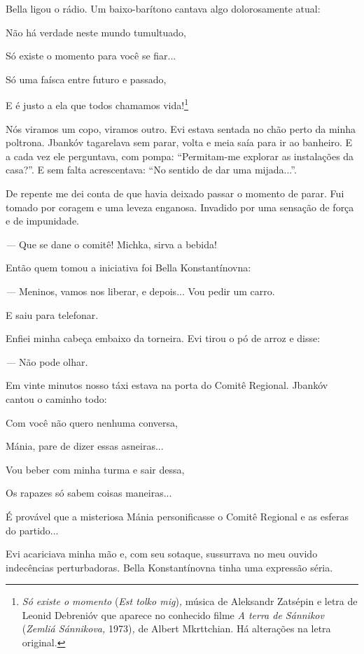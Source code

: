Bella ligou o rádio. Um baixo-barítono cantava algo dolorosamente atual:

Não há verdade neste mundo tumultuado,

Só existe o momento para você se fiar...

Só uma faísca entre futuro e passado,

E é justo a ela que todos chamamos vida!\footnote{\emph{Só existe o
  momento} (\emph{Est tolko mig})\emph{,} música de Aleksandr Zatsépin e
  letra de Leonid Debrenióv que aparece no conhecido filme \emph{A terra
  de Sánnikov} (\emph{Zemliá Sánnikova,} 1973)\emph{,} de Albert
  Mkrttchian. Há alterações na letra original.}

Nós viramos um copo, viramos outro. Evi estava sentada no chão perto da
minha poltrona. Jbankóv tagarelava sem parar, volta e meia saía para ir
ao banheiro. E a cada vez ele perguntava, com pompa: ``Permitam-me
explorar as instalações da casa?''. E sem falta acrescentava: ``No
sentido de dar uma mijada...''.

De repente me dei conta de que havia deixado passar o momento de parar.
Fui tomado por coragem e uma leveza enganosa. Invadido por uma sensação
de força e de impunidade.

\emph{---} Que se dane o comitê! Michka, sirva a bebida!

Então quem tomou a iniciativa foi Bella Konstantínovna:

\emph{---} Meninos, vamos nos liberar, e depois... Vou pedir um carro.

E saiu para telefonar.

Enfiei minha cabeça embaixo da torneira. Evi tirou o pó de arroz e
disse:

\emph{---} Não pode olhar.

Em vinte minutos nosso táxi estava na porta do Comitê Regional. Jbankóv
cantou o caminho todo:

Com você não quero nenhuma conversa,

Mánia, pare de dizer essas asneiras...

Vou beber com minha turma e sair dessa,

Os rapazes só sabem coisas maneiras...

É provável que a misteriosa Mánia personificasse o Comitê Regional e as
esferas do partido...

Evi acariciava minha mão e, com seu sotaque, sussurrava no meu ouvido
indecências perturbadoras. Bella Konstantínovna tinha uma expressão
séria.

